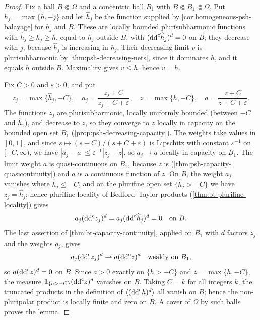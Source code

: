 \begin{proof}
Fix a ball $B\Subset\Omega$ and a concentric ball $B_1$ with $B\Subset B_1\Subset\Omega$. Put $h_j=\max\{h,-j\}$ and let $\widehat h_j$ be the function supplied by \cref{cor:homogeneous-psh-balayage} for $h_j$ and $B$. These are locally bounded plurisubharmonic functions with $\widehat h_j\geq h_j\geq h$, equal to $h_j$ outside $B$, with $(\mathrm{dd}^{\mathrm{c}}\widehat h_j)^d=0$ on $B$; they decrease with $j$, because $\widehat h_j$ is increasing in $h_j$. Their decreasing limit $v$ is plurisubharmonic by \cref{thm:psh-decreasing-nets}, since it dominates $h$, and it equals $h$ outside $B$. Maximality gives $v\leq h$, hence $v=h$.

Fix $C>0$ and $\varepsilon>0$, and put
\[
 z_j=\max\{\widehat h_j,-C\},\quad a_j=\frac{z_j+C}{z_j+C+\varepsilon},\quad z=\max\{h,-C\},\quad a=\frac{z+C}{z+C+\varepsilon}.
\]
The functions $z_j$ are plurisubharmonic, locally uniformly bounded (between $-C$ and $\widehat h_1$), and decrease to $z$, so they converge to $z$ locally in capacity on the bounded open set $B_1$ (\cref{prop:psh-decreasing-capacity}). The weights take values in $[0,1]$, and since $s\mapsto(s+C)/(s+C+\varepsilon)$ is Lipschitz with constant $\varepsilon^{-1}$ on $[-C,\infty)$, we have $|a_j-a|\leq\varepsilon^{-1}|z_j-z|$, so $a_j\to a$ locally in capacity on $B_1$. The limit weight $a$ is quasi-continuous on $B_1$, because $z$ is (\cref{thm:psh-capacity-quasicontinuity}) and $a$ is a continuous function of $z$. On $B$, the weight $a_j$ vanishes where $\widehat h_j\leq-C$, and on the plurifine open set $\{\widehat h_j>-C\}$ we have $z_j=\widehat h_j$; hence plurifine locality of Bedford--Taylor products (\cref{thm:bt-plurifine-locality}) gives
\[
 a_j(\mathrm{dd}^{\mathrm{c}} z_j)^d=a_j(\mathrm{dd}^{\mathrm{c}}\widehat h_j)^d=0\quad\text{on }B.
\]
The last assertion of \cref{thm:bt-capacity-continuity}, applied on $B_1$ with $d$ factors $z_j$ and the weights $a_j$, gives
\[
 a_j(\mathrm{dd}^{\mathrm{c}} z_j)^d\rightharpoonup a(\mathrm{dd}^{\mathrm{c}} z)^d\quad\text{weakly on }B_1,
\]
so $a(\mathrm{dd}^{\mathrm{c}} z)^d=0$ on $B$. Since $a>0$ exactly on $\{h>-C\}$ and $z=\max\{h,-C\}$, the measure $\mathbf1_{\{h>-C\}}(\mathrm{dd}^{\mathrm{c}} z)^d$ vanishes on $B$. Taking $C=k$ for all integers $k$, the truncated products in the definition of $\langle(\mathrm{dd}^{\mathrm{c}} h)^d\rangle$ all vanish on $B$; hence the non-pluripolar product is locally finite and zero on $B$. A cover of $\Omega$ by such balls proves the lemma.
\end{proof}

